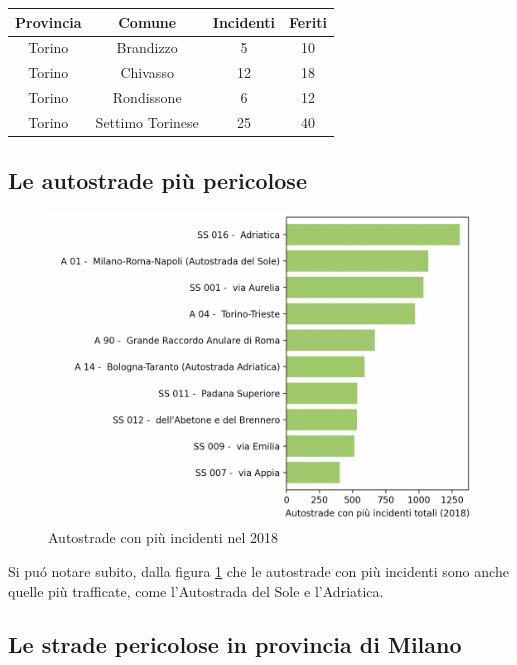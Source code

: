 \documentclass[a4paper]{report}
\begin{document}
\begin{center}
    \def\arraystretch{1.5}%
    \begin{tabular}{ |c|c|c|c| } 
    \hline
    Provincia & Comune & Incidenti & Feriti \\ 
    \hline
    \rowcolor{TableGray}
    Torino & Brandizzo & 5 & 10\\
    Torino & Chivasso & 12 & 18\\
    \rowcolor{TableGray}
    Torino & Rondissone & 6 & 12\\
    Torino & Settimo Torinese & 25 & 40\\
    \hline
    \end{tabular}
\end{center}

\subsection{Le autostrade più pericolose}
\begin{figure}
    \includegraphics[width=\linewidth]{../src/incidenti/incidenti_aci/autostrade/autostrade.png}
    \caption{Autostrade con più incidenti nel 2018}
    \label{fig:incidenti-autostrade}
\end{figure}

Si pu\'o notare subito, dalla figura \ref{fig:incidenti-autostrade} che le autostrade con 
più incidenti sono anche quelle più trafficate, come l'Autostrada del Sole e l'Adriatica.



\subsection{Le strade pericolose in provincia di Milano}
\end{document}
